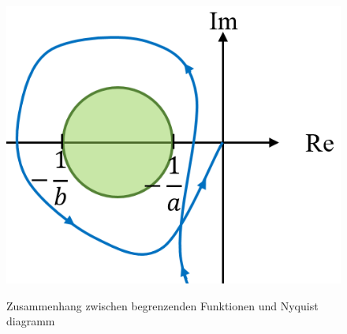 \begin{figure}[!h]
	\begin{minipage}{0.25\linewidth}
		\footnotesize
		\includegraphics[width=1\linewidth]{./bilder/Popov3.png}
		\label{fig:Popov3}
		\caption{Zusammenhang zwischen begrenzenden Funktionen und Nyquist diagramm}
\end{minipage}
\end{figure}

